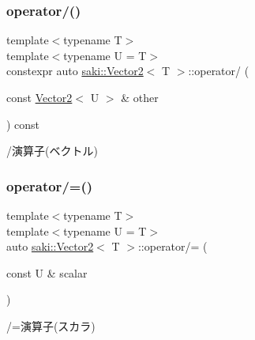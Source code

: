 \subsubsection{\texorpdfstring{operator/()}{operator/()}\hspace{0.1cm}{\footnotesize\ttfamily [2/2]}}
{\footnotesize\ttfamily template$<$typename T$>$ \\
template$<$typename U  = T$>$ \\
constexpr auto \mbox{\hyperlink{classsaki_1_1_vector2}{saki\+::\+Vector2}}$<$ T $>$\+::operator/ (\begin{DoxyParamCaption}\item[{const \mbox{\hyperlink{classsaki_1_1_vector2}{Vector2}}$<$ U $>$ \&}]{other }\end{DoxyParamCaption}) const\hspace{0.3cm}{\ttfamily [inline]}}



/演算子(ベクトル) 

\mbox{\label{classsaki_1_1_vector2_a77f6c9bcfeb9f830edf2883069894a30}} 
\subsubsection{\texorpdfstring{operator/=()}{operator/=()}\hspace{0.1cm}{\footnotesize\ttfamily [1/2]}}
{\footnotesize\ttfamily template$<$typename T$>$ \\
template$<$typename U  = T$>$ \\
auto \mbox{\hyperlink{classsaki_1_1_vector2}{saki\+::\+Vector2}}$<$ T $>$\+::operator/= (\begin{DoxyParamCaption}\item[{const U \&}]{scalar }\end{DoxyParamCaption})\hspace{0.3cm}{\ttfamily [inline]}}



/=演算子(スカラ) 

\mbox{\label{classsaki_1_1_vector2_a8d4c4c7a19f84fc4eac995bdf9f93a13}} 
